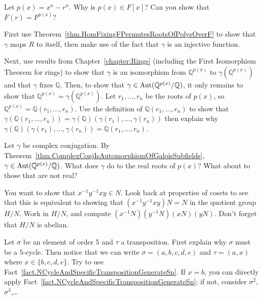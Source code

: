 \begin{hint*}
Let $p(x) = x^n-r^n$. Why is $p(x) \in F[x]$? Can you show that $F(r) = F^{p(x)}$?
\end{hint*}

\begin{hint*}
First use Theorem~\ref{thm.HomFixingFPermutesRootsOfPolysOverF} to show that $\gamma$ maps $R$ to itself, then make use of the fact that $\gamma$ is an injective function. 

Next, use results from Chapter~\ref{chapter:Rings} (including the First Isomorphism Theorem for rings) to show that $\gamma$ is an isomorphism from $\mathbb{Q}^{p(x)}$ to $\gamma(\mathbb{Q}^{p(x)})$ and that $\gamma$ fixes $\mathbb{Q}$. Then, to show that $\gamma \in \operatorname{Aut}(\mathbb{Q}^{p(x)}/\mathbb{Q})$, it only remains to show that $\mathbb{Q}^{p(x)} = \gamma(\mathbb{Q}^{p(x)})$. Let $r_1,\ldots,r_n$ be the roots of $p(x)$, so $\mathbb{Q}^{p(x)} = \mathbb{Q}(r_1,\ldots,r_n)$. Use the definition of $\mathbb{Q}(r_1,\ldots,r_n)$ to show that $\gamma(\mathbb{Q}(r_1,\ldots,r_n)) = \gamma(\mathbb{Q})(\gamma(r_1),\ldots,\gamma(r_n))$ then explain why  $\gamma(\mathbb{Q})(\gamma(r_1),\ldots,\gamma(r_n)) = \mathbb{Q}(r_1,\ldots,r_n)$.
\end{hint*}

\begin{hint*}
 Let $\gamma$ be complex conjugation. By Theorem~\ref{thm.ComplexConjIsAutomorphismOfGaloisSubfields}, $\gamma\in \operatorname{Aut}(\mathbb{Q}^{p(x)}/\mathbb{Q})$. What does $\gamma$ do to the real roots of $p(x)$? What about to those that are not real?
\end{hint*}

\begin{hint*}
You want to show that $x^{-1}y^{-1}xy \in N$. Look back at properties of cosets to see that this is equivalent to showing that  $(x^{-1}y^{-1}xy)N = N$ in the quotient group $H/N$. Work in $H/N$, and compute $(x^{-1}N)(y^{-1}N)(xN)(yN)$. Don't forget that $H/N$ is abelian.
\end{hint*}

\begin{hint*}
Let $\sigma$ be an element of order 5 and $\tau$ a transposition. First explain why $\sigma$ must be a $5$-cycle. Then notice that we can write $\sigma = (a,b,c,d,e)$ and $\tau = (a,x)$ where $x\in \{b,c,d,e\}$. Try to use Fact~\ref{fact.NCycleAndSpecificTranspositionGenerateSn}. If $x=b$, you can directly apply 
Fact~\ref{fact.NCycleAndSpecificTranspositionGenerateSn}; if not, consider $\sigma^2$, $\sigma^3$,\ldots
\end{hint*}






